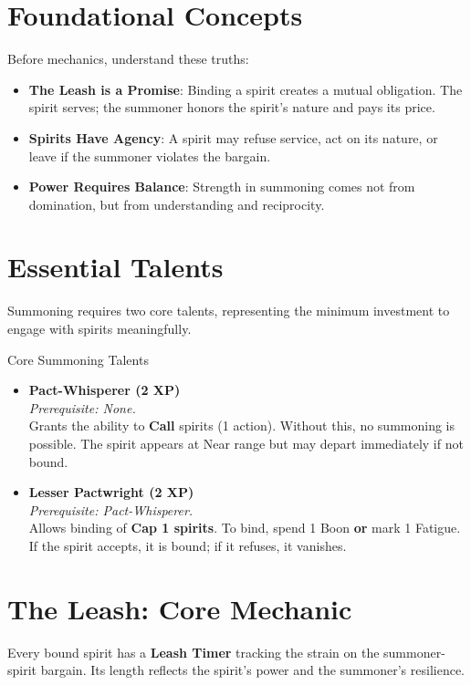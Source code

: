 \documentclass[11pt,twoside]{book}
\begin{document}
\section{Foundational Concepts}
Before mechanics, understand these truths:
\begin{itemize}
  \item \textbf{The Leash is a Promise}: Binding a spirit creates a mutual obligation. The spirit serves; the summoner honors the spirit's nature and pays its price.
  \item \textbf{Spirits Have Agency}: A spirit may refuse service, act on its nature, or leave if the summoner violates the bargain.
  \item \textbf{Power Requires Balance}: Strength in summoning comes not from domination, but from understanding and reciprocity.
\end{itemize}

\section{Essential Talents}
Summoning requires two core talents, representing the minimum investment to engage with spirits meaningfully.

\begin{mechbox}{Core Summoning Talents}
  \begin{itemize}
    \item \textbf{Pact-Whisperer (2 XP)} \\
      \textit{Prerequisite: None.} \\
      Grants the ability to \textbf{Call} spirits (1 action). Without this, no summoning is possible. The spirit appears at Near range but may depart immediately if not bound.
    \item \textbf{Lesser Pactwright (2 XP)} \\
      \textit{Prerequisite: Pact-Whisperer.} \\
      Allows binding of \textbf{Cap 1 spirits}. To bind, spend 1 Boon \textbf{or} mark 1 Fatigue. If the spirit accepts, it is bound; if it refuses, it vanishes.
  \end{itemize}
\end{mechbox}

\section{The Leash: Core Mechanic}
Every bound spirit has a \textbf{Leash Timer } tracking the strain on the summoner-spirit bargain. Its length reflects the spirit's power and the summoner's resilience.
\end{document}
